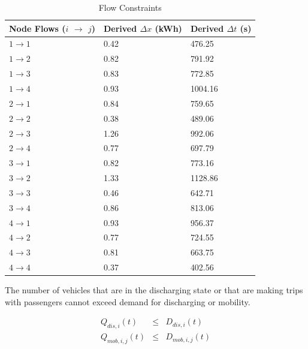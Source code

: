 \documentclass[journal]{IEEEtran}
\begin{document}
\begin{table}[!htbp]
    \renewcommand{\arraystretch}{1}
    \caption{Flow Constraints}
    \label{tab:flow constraints}
    \centering
    \def\colmargin{6.75cm}
    \begin{tabular}{lll}
    \hline
    \textbf{Node Flows ($i$ $\rightarrow$ $j$)} & \textbf{Derived} $\Delta x$ (kWh) & \textbf{Derived} $\Delta t$ (s) \\
    \hline
    $1\rightarrow1$ & 0.42  & 476.25  \\
    $1\rightarrow2$ & 0.82  & 791.92  \\
    $1\rightarrow3$ & 0.83  & 772.85  \\
    $1\rightarrow4$ & 0.93  & 1004.16  \\
    $2\rightarrow1$ & 0.84  & 759.65  \\
    $2\rightarrow2$ & 0.38  & 489.06  \\
    $2\rightarrow3$ & 1.26  & 992.06  \\
    $2\rightarrow4$ & 0.77  & 697.79  \\
    $3\rightarrow1$ & 0.82  & 773.16  \\
    $3\rightarrow2$ & 1.33  & 1128.86  \\
    $3\rightarrow3$ & 0.46  & 642.71  \\
    $3\rightarrow4$ & 0.86  & 813.06  \\
    $4\rightarrow1$ & 0.93  & 956.37  \\
    $4\rightarrow2$ & 0.77  & 724.55  \\
    $4\rightarrow3$ & 0.81  & 663.75  \\
    $4\rightarrow4$ & 0.37  & 402.56  \\
    \hline
    \end{tabular}
\end{table}

The number of vehicles that are in the discharging state or that are making trips with passengers cannot exceed demand for discharging or mobility.

\begin{eqnarray*}
   Q_{dis,i}(t) & \le & D_{dis,i}(t) \\
   Q_{mob,i,j}(t) & \le & D_{mob,i,j}(t) \\
\end{eqnarray*}
\end{document}
